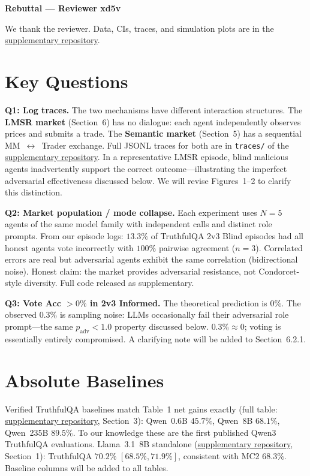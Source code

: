 \documentclass[10pt]{article}
\newcommand{\supp}{\href{[ANONYMISED\_REPO\_URL]}{supplementary repository}}
\begin{document}
\begin{center}
  {\large\bfseries Rebuttal --- Reviewer xd5v}
\end{center}

We thank the reviewer. Data, CIs, traces, and simulation plots are in the \supp.

\section*{Key Questions}

\textbf{Q1: Log traces.}
The two mechanisms have different interaction structures. The \textbf{LMSR
market} (Section~6) has no dialogue: each agent independently observes prices
and submits a trade. The \textbf{Semantic market} (Section~5) has a sequential
MM~$\leftrightarrow$~Trader exchange. Full JSONL traces for both are in
\texttt{traces/} of the \supp. In a representative LMSR episode, blind
malicious agents inadvertently support the correct outcome---illustrating
the imperfect adversarial effectiveness discussed below. We will revise
Figures~1--2 to clarify this distinction.

\textbf{Q2: Market population / mode collapse.}
Each experiment uses $N{=}5$ agents of the same model family with independent
calls and distinct role prompts. From our episode logs: $13.3\%$ of TruthfulQA
2v3 Blind episodes had all honest agents vote incorrectly with $100\%$ pairwise
agreement ($n{=}3$). Correlated errors are real but adversarial agents exhibit
the same correlation (bidirectional noise). Honest claim: the market provides
adversarial resistance, not Condorcet-style diversity. Full code released as
supplementary.

\textbf{Q3: Vote Acc $>0\%$ in 2v3 Informed.}
The theoretical prediction is $0\%$. The observed $0.3\%$ is sampling noise:
LLMs occasionally fail their adversarial role prompt---the same $p_\text{adv}
< 1.0$ property discussed below. $0.3\% \approx 0$; voting is essentially
entirely compromised. A clarifying note will be added to Section~6.2.1.

\section*{Absolute Baselines}

Verified TruthfulQA baselines match Table~1 net gains exactly (full table:
\supp, Section~3): Qwen~0.6B $45.7\%$, Qwen~8B $68.1\%$, Qwen~235B $89.5\%$.
To our knowledge these are the first published Qwen3 TruthfulQA evaluations.
Llama~3.1~8B standalone (\supp, Section~1): TruthfulQA $70.2\%$ $[68.5\%,
71.9\%]$, consistent with MC2 $68.3\%$. Baseline columns will be added to
all tables.
\end{document}

